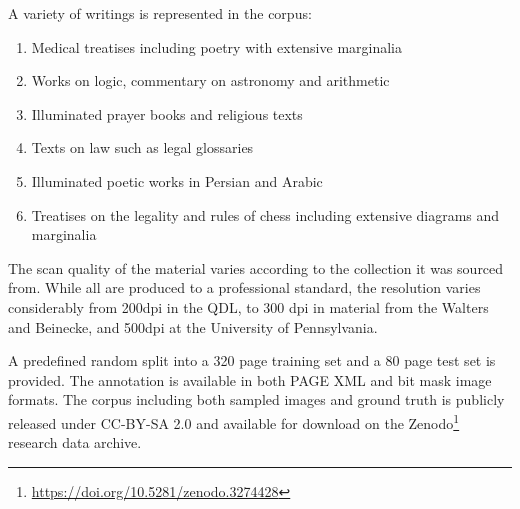 A variety of writings is represented in the corpus:

\begin{enumerate}
	\item Medical treatises including poetry with extensive marginalia
	\item Works on logic, commentary on astronomy and arithmetic
	\item Illuminated prayer books and religious texts
	\item Texts on law such as legal glossaries
	\item Illuminated poetic works in Persian and Arabic
	\item Treatises on the legality and rules of chess including extensive diagrams and marginalia
\end{enumerate}

The scan quality of the material varies according to the collection it was
sourced from. While all are produced to a professional standard, the resolution
varies considerably from 200dpi in the QDL, to 300 dpi in material from the
Walters and Beinecke, and 500dpi at the University of Pennsylvania.

A predefined random split into a 320 page training set and a 80 page test set
is provided. The annotation is available in both PAGE XML and bit mask image
formats.  The corpus including both sampled images and ground truth is publicly
released under CC-BY-SA 2.0 and available for download on the 
Zenodo\footnote{\url{https://doi.org/10.5281/zenodo.3274428}} research data archive.

